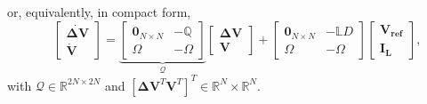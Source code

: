 \documentclass[a4paper]{article}
\theoremstyle{plain}
\begin{document}
or, equivalently, in compact form,
\begin{equation*}
\label{eq:compact_1st_order}
\quad
\begin{bmatrix}
\mathbf{\dot { {\Delta V}}}\\
\mathbf{\dot{V}}
\end{bmatrix} =\underbrace{ \begin{bmatrix}
	\mathbf{0}_{N\times N} & -\mathbb{Q}\\
	\Omega & -\Omega 
	\end{bmatrix} }_{\mathcal{Q}} \begin{bmatrix}
\mathbf{\Delta V}\\
\mathbf{V}
\end{bmatrix}+ \begin{bmatrix}
\mathbf{0}_{N\times N}& -\mathbb{L}D\\
\Omega & -\Omega 
\end{bmatrix}  \begin{bmatrix}
\mathbf{{V_{ref}}}\\
\mathbf{I_{L}}
\end{bmatrix},
\end{equation*}
with $\mathcal{Q}\in\mathbb{R}^{2N\times 2N}$ and $[\mathbf{\Delta V}^T \mathbf{V}^T]^T\in \mathbb{R}^N\times\mathbb{R}^N$.
\end{document}
